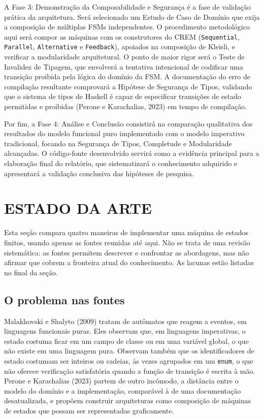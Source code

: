 \documentclass[12pt,a4paper]{article}
\begin{document}
A Fase 3: Demonstração da Composabilidade e Segurança é a fase de validação prática da arquitetura. Será selecionado um Estudo de Caso de Domínio que exija a composição de múltiplas FSMs independentes. O procedimento metodológico aqui será compor as máquinas com os construtores do CREM (\texttt{Sequential}, \texttt{Parallel}, \texttt{Alternative} e \texttt{Feedback}), apoiados na composição de Kleisli, e verificar a modularidade arquitetural. O ponto de maior rigor será o Teste de Invalidez de Tipagem, que envolverá a tentativa intencional de codificar uma transição proibida pela lógica do domínio da FSM. A documentação do erro de compilação resultante comprovará a Hipótese de Segurança de Tipos, validando que o sistema de tipos de Haskell é capaz de especificar transições de estado permitidas e proibidas (Perone e Karachalias, 2023) em tempo de compilação.

Por fim, a Fase 4: Análise e Conclusão consistirá na comparação qualitativa dos resultados do modelo funcional puro implementado com o modelo imperativo tradicional, focando na Segurança de Tipos, Completude e Modularidade alcançadas. O código-fonte desenvolvido servirá como a evidência principal para a elaboração final do relatório, que sistematizará o conhecimento adquirido e apresentará a validação conclusiva das hipóteses de pesquisa.

\section{ESTADO DA ARTE}

Esta seção compara quatro maneiras de implementar uma máquina de estados finitos, usando apenas as fontes reunidas até aqui. Não se trata de uma revisão sistemática: as fontes permitem descrever e confrontar as abordagens, mas não afirmar que cobrem a fronteira atual do conhecimento. As lacunas estão listadas no final da seção.

\subsection{O problema nas fontes}

Malakhovski e Shalyto (2009) tratam de autômatos que reagem a eventos, em linguagens funcionais puras. Eles observam que, em linguagens imperativas, o estado costuma ficar em um campo de classe ou em uma variável global, o que não existe em uma linguagem pura. Observam também que os identificadores de estado costumam ser inteiros ou cadeias, às vezes agrupados em um \texttt{enum}, o que não oferece verificação satisfatória quando a função de transição é escrita à mão. Perone e Karachalias (2023) partem de outro incômodo, a distância entre o modelo do domínio e a implementação, comparável à de uma documentação desatualizada, e propõem construir arquiteturas como composição de máquinas de estados que possam ser representadas graficamente.
\end{document}
